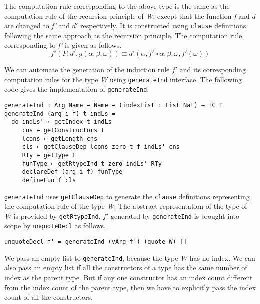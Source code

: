 \documentclass[sigplan,10pt]{acmart}
\begin{document}
The computation rule corresponding to the above type is the same as the computation rule of the recursion principle of \emph{W}, except that the function \emph{f} and $d$ are changed to \emph{f'} and $d'$ respectively. It is constructed using {\tt clause} definitions following the same approach as the recursion principle. The computation rule corresponding to \emph{f'} is given as follows.
\begin{equation}
f' (P, d', g (\alpha, \beta, \omega)) \equiv d' (\alpha, f' \circ \alpha, \beta, \omega, f' (\omega)) \nonumber
\end{equation}

We can automate the generation of the induction rule $f'$ and its corresponding computation rules for the type \emph{W} using {\tt generateInd} interface. The following code gives the implementation of {\tt generateInd}.

\begin{center}
\begingroup
\fontsize{7pt}{9pt}\selectfont
\begin{Verbatim}
generateInd : Arg Name → Name → (indexList : List Nat) → TC ⊤
generateInd (arg i f) t indLs =
  do indLs' ← getIndex t indLs
     cns ← getConstructors t
     lcons ← getLength cns
     cls ← getClauseDep lcons zero t f indLs' cns
     RTy ← getType t
     funType ← getRtypeInd t zero indLs' RTy
     declareDef (arg i f) funType
     defineFun f cls
\end{Verbatim}
\endgroup
\end{center}

\normalsize

{\tt generateInd} uses {\tt getClauseDep} to generate the {\tt clause} definitions representing the computation rule of the type \emph{W}. The abstract representation of the type of \emph{W} is provided by {\tt getRtypeInd}. $f'$ generated by {\tt generateInd} is brought into scope by {\tt unquoteDecl} as follows.
\begin{center}
\begingroup
\fontsize{8pt}{9pt}\selectfont
\begin{Verbatim}
unquoteDecl f' = generateInd (vArg f') (quote W) []
\end{Verbatim}
\endgroup
\end{center}
\normalsize

We pass an empty list to {\tt generateInd}, because the type \emph{W} has no index. We can also pass an empty list if all the constructors of a type has the same number of index as the parent type. But if any one constructor has an index count different from the index count of the parent type, then we have to explicitly pass the index count of all the constructors.
\end{document}

